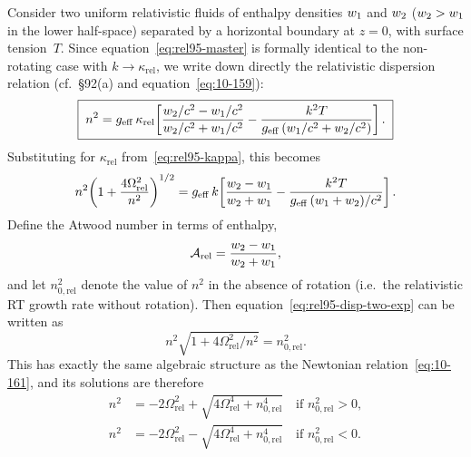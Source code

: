 Consider two uniform relativistic fluids of enthalpy densities
$w_{1}$ and $w_{2}$ ($w_{2} > w_{1}$
in the lower half-space) separated by a horizontal boundary at
$z=0$, with surface tension~$T$.  Since
equation~\eqref{eq:rel95-master} is formally identical to the
non-rotating case with $k\to\kappa_{\mathrm{rel}}$, we write
down directly the relativistic dispersion relation (cf.\
\S92(a) and equation~\eqref{eq:10-159}):
\begin{equation}
  \boxed{\;
  n^{2} = g_{\mathrm{eff}}\,\kappa_{\mathrm{rel}}\!
  \left[
    \frac{w_{2}/c^{2}-w_{1}/c^{2}}
         {w_{2}/c^{2}+w_{1}/c^{2}}
    - \frac{k^{2}T}
           {g_{\mathrm{eff}}\,(w_{1}/c^{2}+w_{2}/c^{2})}
  \right].
  \;}
  \label{eq:rel95-disp-two}
\end{equation}
Substituting for $\kappa_{\mathrm{rel}}$ from~\eqref{eq:rel95-kappa},
this becomes
\begin{equation}
  n^{2}\!\left(1+\frac{4\Omega_{\mathrm{rel}}^{2}}{n^{2}}\right)^{1/2}
    = g_{\mathrm{eff}}\,k\!
    \left[
      \frac{w_{2}-w_{1}}
           {w_{2}+w_{1}}
      - \frac{k^{2}T}
             {g_{\mathrm{eff}}\,(w_{1}+w_{2})/c^{2}}
    \right].
  \label{eq:rel95-disp-two-exp}
\end{equation}
Define the Atwood number in terms of enthalpy,
\begin{equation}
  \mathcal{A}_{\mathrm{rel}}
    = \frac{w_{2} - w_{1}}
           {w_{2} + w_{1}},
  \label{eq:rel95-atwood}
\end{equation}
and let $n_{0,\mathrm{rel}}^{2}$ denote the value of $n^{2}$ in the
absence of rotation (i.e.\ the relativistic RT growth rate without
rotation).  Then equation~\eqref{eq:rel95-disp-two-exp} can be
written as
\begin{equation}
  n^{2}\sqrt{1+4\Omega_{\mathrm{rel}}^{2}/n^{2}}
    = n_{0,\mathrm{rel}}^{2}.
  \label{eq:rel95-n-vs-n0}
\end{equation}
This has exactly the same algebraic structure as the Newtonian
relation~\eqref{eq:10-161}, and its solutions are therefore
\begin{align}
  n^{2} &= -2\Omega_{\mathrm{rel}}^{2}
    + \sqrt{4\Omega_{\mathrm{rel}}^{4}
      + n_{0,\mathrm{rel}}^{4}}
  \quad\text{if } n_{0,\mathrm{rel}}^{2} > 0,
  \label{eq:rel95-sol-unstab}\\[4pt]
  n^{2} &= -2\Omega_{\mathrm{rel}}^{2}
    - \sqrt{4\Omega_{\mathrm{rel}}^{4}
      + n_{0,\mathrm{rel}}^{4}}
  \quad\text{if } n_{0,\mathrm{rel}}^{2} < 0.
  \label{eq:rel95-sol-stab}
\end{align}

